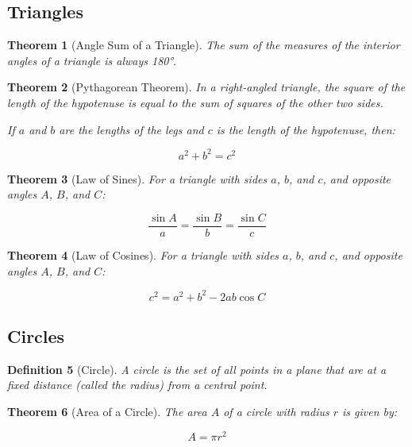 \documentclass[12pt]{article}
\newif\ifDarkMode
\newcommand{\eqcolor}[1]{\ifDarkMode\textcolor{draculaPurple}{#1}\else#1\fi}
\newcommand{\varcolor}[1]{\ifDarkMode\textcolor{draculaGreen}{#1}\else#1\fi}
\newtheorem{theorem}{Theorem}[section]
\newtheorem{definition}[theorem]{Definition}
\begin{document}
\subsection{\textcolor{draculaYellow}{Triangles}}

\begin{theorem}[Angle Sum of a Triangle]
The sum of the measures of the interior angles of a triangle is always 180°.
\end{theorem}

\begin{theorem}[Pythagorean Theorem]
In a right-angled triangle, the square of the length of the hypotenuse is equal to the sum of squares of the other two sides.

If $\varcolor{a}$ and $\varcolor{b}$ are the lengths of the legs and $\varcolor{c}$ is the length of the hypotenuse, then:

\[
\eqcolor{a^2 + b^2 = c^2}
\]
\end{theorem}

\begin{theorem}[Law of Sines]
For a triangle with sides $\varcolor{a}$, $\varcolor{b}$, and $\varcolor{c}$, and opposite angles $\varcolor{A}$, $\varcolor{B}$, and $\varcolor{C}$:

\[
\eqcolor{\frac{\sin A}{a} = \frac{\sin B}{b} = \frac{\sin C}{c}}
\]
\end{theorem}

\begin{theorem}[Law of Cosines]
For a triangle with sides $\varcolor{a}$, $\varcolor{b}$, and $\varcolor{c}$, and opposite angles $\varcolor{A}$, $\varcolor{B}$, and $\varcolor{C}$:

\[
\eqcolor{c^2 = a^2 + b^2 - 2ab\cos C}
\]
\end{theorem}

\subsection{\textcolor{draculaYellow}{Circles}}

\begin{definition}[Circle]
A circle is the set of all points in a plane that are at a fixed distance (called the radius) from a central point.
\end{definition}

\begin{theorem}[Area of a Circle]
The area $\varcolor{A}$ of a circle with radius $\varcolor{r}$ is given by:

\[
\eqcolor{A = \pi r^2}
\]
\end{theorem}
\end{document}
